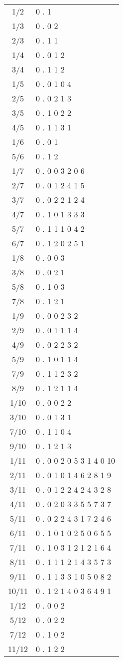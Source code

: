 \documentclass[12pt]{article}
\begin{document}
\begin{tabular}
{| c | l |}
1/2 & 0 . 1 \\ 
1/3 & 0 . 0 2 \\ 
2/3 & 0 . 1 1 \\ 
1/4 & 0 . 0 1 2 \\ 
3/4 & 0 . 1 1 2 \\ 
1/5 & 0 . 0 1 0 4 \\ 
2/5 & 0 . 0 2 1 3 \\ 
3/5 & 0 . 1 0 2 2 \\ 
4/5 & 0 . 1 1 3 1 \\ 
1/6 & 0 . 0 1 \\ 
5/6 & 0 . 1 2 \\
1/7 & 0 . 0 0 3 2 0 6 \\
2/7 & 0 . 0 1 2 4 1 5 \\
3/7 & 0 . 0 2 2 1 2 4 \\
4/7 & 0 . 1 0 1 3 3 3 \\
5/7 & 0 . 1 1 1 0 4 2 \\
6/7 & 0 . 1 2 0 2 5 1 \\
1/8 & 0 . 0 0 3 \\
3/8 & 0 . 0 2 1 \\
5/8 & 0 . 1 0 3 \\
7/8 & 0 . 1 2 1 \\
1/9 & 0 . 0 0 2 3 2 \\
2/9 & 0 . 0 1 1 1 4 \\
4/9 & 0 . 0 2 2 3 2 \\
5/9 & 0 . 1 0 1 1 4 \\
7/9 & 0 . 1 1 2 3 2 \\
8/9 & 0 . 1 2 1 1 4 \\
1/10 & 0 . 0 0 2 2 \\
3/10 & 0 . 0 1 3 1 \\
7/10 & 0 . 1 1 0 4 \\
9/10 & 0 . 1 2 1 3 \\
1/11 & 0 . 0 0 2 0 5 3 1 4 0 10 \\
2/11 & 0 . 0 1 0 1 4 6 2 8 1 9 \\
3/11 & 0 . 0 1 2 2 4 2 4 3 2 8 \\
4/11 & 0 . 0 2 0 3 3 5 5 7 3 7 \\
5/11 & 0 . 0 2 2 4 3 1 7 2 4 6 \\
6/11 & 0 . 1 0 1 0 2 5 0 6 5 5 \\
7/11 & 0 . 1 0 3 1 2 1 2 1 6 4 \\
8/11 & 0 . 1 1 1 2 1 4 3 5 7 3 \\
9/11 & 0 . 1 1 3 3 1 0 5 0 8 2 \\
10/11 & 0 . 1 2 1 4 0 3 6 4 9 1 \\
1/12 & 0 . 0 0 2 \\
5/12 & 0 . 0 2 2 \\
7/12 & 0 . 1 0 2 \\
11/12 & 0 . 1 2 2 
\end{tabular}
\end{document}
